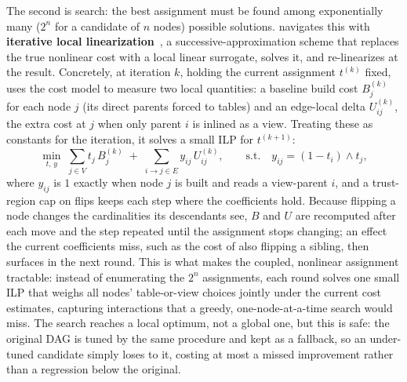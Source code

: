 The second is search: the best assignment must be found among exponentially many ($2^n$ for a candidate of $n$ nodes) possible solutions. \dagsmith{} navigates this with \textbf{iterative local linearization}~\cite{griffith1961slp,palaciosgomez1982slp}, a successive-approximation scheme that replaces the true nonlinear cost with a local linear surrogate, solves it, and re-linearizes at the result. Concretely, at iteration $k$, holding the current assignment $t^{(k)}$ fixed, \dagsmith{} uses the cost model to measure two local quantities: a baseline build cost $B^{(k)}_j$ for each node $j$ (its direct parents forced to tables) and an edge-local delta $U^{(k)}_{ij}$, the extra cost at $j$ when only parent $i$ is inlined as a view. Treating these as constants for the iteration, it solves a small ILP for $t^{(k+1)}$:
\begin{equation*}
\min_{t,\,y}\; \sum_{j \in V} t_j\, B^{(k)}_j \;+\; \sum_{i \to j \in E} y_{ij}\, U^{(k)}_{ij}, \qquad \text{s.t.}\quad y_{ij} = (1 - t_i) \wedge t_j,
\end{equation*}
where $y_{ij}$ is $1$ exactly when node $j$ is built and reads a view-parent $i$, and a trust-region cap on flips keeps each step where the coefficients hold. 
Because flipping a node changes the cardinalities its descendants see, $B$ and $U$ are recomputed after each move and the step repeated until the assignment stops changing; an effect the current coefficients miss, such as the cost of also flipping a sibling, then surfaces in the next round. This is what makes the coupled, nonlinear assignment tractable: instead of enumerating the $2^n$ assignments, each round solves one small ILP that weighs all nodes' table-or-view choices jointly under the current cost estimates, capturing interactions that a greedy, one-node-at-a-time search would miss. The search reaches a local optimum, not a global one, but this is safe: the original DAG is tuned by the same procedure and kept as a fallback, so an under-tuned candidate simply loses to it, costing at most a missed improvement rather than a regression below the original.



